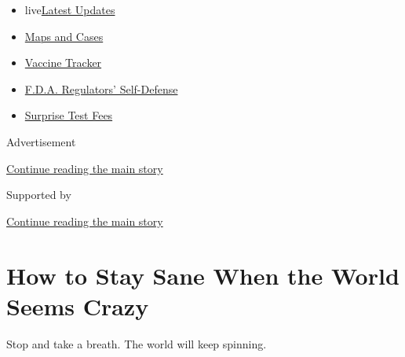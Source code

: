 \begin{itemize}
\tightlist
\item
  live\href{https://www.nytimes3xbfgragh.onion/2020/09/11/world/covid-19-coronavirus.html?name=styln-coronavirus-national\&region=TOP_BANNER\&block=storyline_menu_recirc\&action=click\&pgtype=Article\&impression_id=f1e894a1-f4b9-11ea-977b-75df3e68102f\&variant=undefined}{Latest
  Updates}
\item
  \href{https://www.nytimes3xbfgragh.onion/interactive/2020/us/coronavirus-us-cases.html?name=styln-coronavirus-national\&region=TOP_BANNER\&block=storyline_menu_recirc\&action=click\&pgtype=Article\&impression_id=f1e894a2-f4b9-11ea-977b-75df3e68102f\&variant=undefined}{Maps
  and Cases}
\item
  \href{https://www.nytimes3xbfgragh.onion/interactive/2020/science/coronavirus-vaccine-tracker.html?name=styln-coronavirus-national\&region=TOP_BANNER\&block=storyline_menu_recirc\&action=click\&pgtype=Article\&impression_id=f1e894a3-f4b9-11ea-977b-75df3e68102f\&variant=undefined}{Vaccine
  Tracker}
\item
  \href{https://www.nytimes3xbfgragh.onion/2020/09/10/us/politics/fda-coronavirus-vaccine.html?name=styln-coronavirus-national\&region=TOP_BANNER\&block=storyline_menu_recirc\&action=click\&pgtype=Article\&impression_id=f1e894a4-f4b9-11ea-977b-75df3e68102f\&variant=undefined}{F.D.A.
  Regulators' Self-Defense}
\item
  \href{https://www.nytimes3xbfgragh.onion/2020/09/09/upshot/coronavirus-surprise-test-fees.html?name=styln-coronavirus-national\&region=TOP_BANNER\&block=storyline_menu_recirc\&action=click\&pgtype=Article\&impression_id=f1e894a5-f4b9-11ea-977b-75df3e68102f\&variant=undefined}{Surprise
  Test Fees}
\end{itemize}

Advertisement

\protect\hyperlink{after-top}{Continue reading the main story}

Supported by

\protect\hyperlink{after-sponsor}{Continue reading the main story}

\hypertarget{how-to-stay-sane-when-the-world-seems-crazy}{%
\section{How to Stay Sane When the World Seems
Crazy}\label{how-to-stay-sane-when-the-world-seems-crazy}}

Stop and take a breath. The world will keep spinning.


